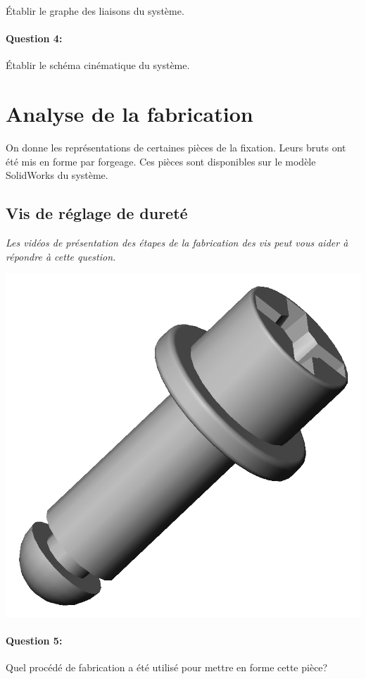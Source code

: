 Établir le graphe des liaisons du système.

\vspace{5cm}

\paragraph{Question 4:}

Établir le schéma cinématique du système.

\vspace{5cm}

\section{Analyse de la fabrication}

On donne les représentations de certaines pièces de la fixation. Leurs bruts ont été mis en forme par forgeage. Ces pièces sont disponibles sur le modèle SolidWorks du système.

\subsection{Vis de réglage de dureté}

\textit{Les vidéos de présentation des étapes de la fabrication des vis peut vous aider à répondre à cette question.}

 \begin{minipage}{0.3\linewidth}
    \centering\includegraphics[width=1\linewidth]{img/vis.png}
 \end{minipage}
 \hfill
 \begin{minipage}{0.65\linewidth}
 \paragraph{Question 5:} Quel procédé de fabrication a été utilisé pour mettre en forme cette pièce?
 
 \end{minipage}


